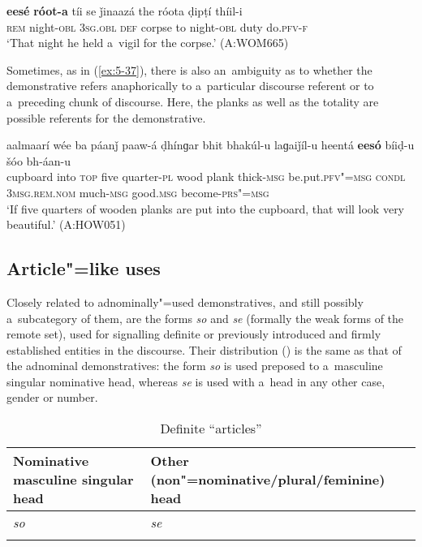 \begin{exe}
\ex
\label{ex:5-36}
\gll \textbf{eesé} \textbf{róot-a} tíi se ǰinaazá the róota ḍipṭí thíil-i\\
\textsc{rem} night-\textsc{obl} \textsc{3sg.obl} \textsc{def} corpse to night-\textsc{obl} duty do.\textsc{pfv-f}\\
\glt `That night he held a~vigil for the corpse.' (A:WOM665)
\end{exe}

Sometimes, as in (\ref{ex:5-37}), there is also an~ambiguity as to whether the demonstrative refers anaphorically to a~particular discourse referent or to a~preceding chunk of discourse. Here, the planks as well as the totality are possible referents for the demonstrative.

\begin{exe}
\ex
\label{ex:5-37}
\gll aalmaarí wée ba páanǰ paaw-á ḍhínɡar bhit bhakúl-u laɡaiǰíl-u heentá \textbf{eesó} bíiḍ-u šóo bh-áan-u \\
cupboard into \textsc{top} five quarter-\textsc{pl} wood plank thick-\textsc{msg} be.put.\textsc{pfv"=msg} \textsc{condl} \textsc{3msg.rem.nom} much-\textsc{msg} good.\textsc{msg} become-\textsc{prs"=msg}\\
\glt `If five quarters of wooden planks are put into the cupboard, that will look very beautiful.'
(A:HOW051)
\end{exe}



\subsection{Article"=like uses}
\label{subsec:5-2-6}

Closely related to adnominally"=used demonstratives, and still possibly a~subcategory of them, are the forms \textit{so} and \textit{se} (formally the weak forms of the remote set), used for signalling definite or previously introduced and firmly established entities in the discourse. Their distribution () is the same as that of the adnominal demonstratives: the form \textit{so} is used preposed to a~masculine singular nominative head, whereas \textit{se} is used with a~head in any other case, gender or number. 


\begin{table}[ht]
 \caption{Definite ``articles''}
\begin{tabularx}{\textwidth}{ Q Q }
\lsptoprule
Nominative masculine singular head &
Other (non"=nominative/plural/feminine) head\\\hline
\textit{so} &
\textit{se} \\\lspbottomrule
\end{tabularx}
\label{tab:5-5}
\end{table}

